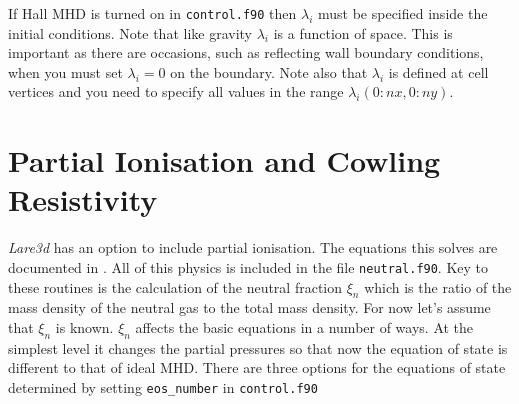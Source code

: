 \documentclass[11pt]{article}
\begin{document}
If Hall MHD is turned on in \texttt{control.f90} then $\lambda_i$ must be specified inside the initial conditions. Note that like gravity $\lambda_i$ is a function of space. This is important as there are occasions, such as reflecting wall boundary conditions, when you must set $\lambda_i = 0$ on the boundary. Note also that $\lambda_i$ is defined at cell vertices and you need to specify all values in the range $\lambda_i(0:nx, 0:ny)$.

\section{Partial Ionisation and Cowling Resistivity}
{\it Lare3d} has an option to include partial ionisation. The equations this solves are documented in \cite{flux-emergence}. All of this physics is included in the file \texttt{neutral.f90}. Key to these routines is the calculation of the neutral fraction $\xi_n$ which is the ratio of the mass density of the neutral gas to the total mass density. For now let's assume that $\xi_n$ is known. $\xi_n$ affects the basic equations in a number of ways. At the simplest level it changes the partial pressures so that now the equation of state is different to that of ideal MHD. There are three options for the equations of state determined by setting \texttt{eos\_number} in \texttt{control.f90} 
\end{document}
